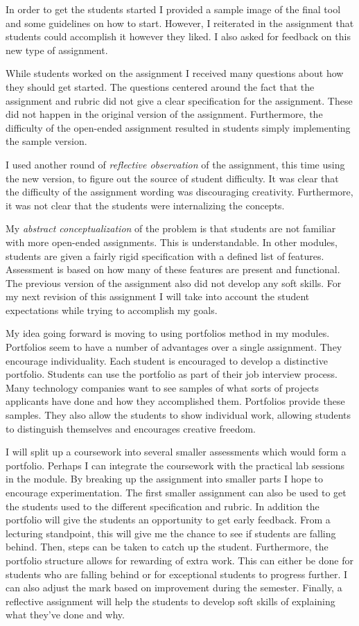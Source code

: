 \documentclass[
]{article}
\begin{document}
In order to get the students started I provided a sample image of the
final tool and some guidelines on how to start. However, I reiterated in
the assignment that students could accomplish it however they liked. I
also asked for feedback on this new type of assignment.

While students worked on the assignment I received many questions about
how they should get started. The questions centered around the fact that
the assignment and rubric did not give a clear specification for the
assignment. These did not happen in the original version of the
assignment. Furthermore, the difficulty of the open-ended assignment
resulted in students simply implementing the sample version.

I used another round of \emph{reflective observation} of the assignment,
this time using the new version, to figure out the source of student
difficulty. It was clear that the difficulty of the assignment wording
was discouraging creativity. Furthermore, it was not clear that the
students were internalizing the concepts.

My \emph{abstract conceptualization} of the problem is that students are
not familiar with more open-ended assignments. This is understandable.
In other modules, students are given a fairly rigid specification with a
defined list of features. Assessment is based on how many of these
features are present and functional. The previous version of the
assignment also did not develop any soft skills. For my next revision of
this assignment I will take into account the student expectations while
trying to accomplish my goals.

My idea going forward is moving to using portfolios method in
my modules. Portfolios seem to have a number of advantages over a single
assignment. They encourage individuality. Each student is encouraged to
develop a distinctive portfolio. Students can use the portfolio as part
of their job interview process. Many technology companies want to see
samples of what sorts of projects applicants have done and how they
accomplished them. Portfolios provide these samples. They also allow the
students to show individual work, allowing students to distinguish
themselves and encourages creative freedom.

I will split up a coursework into several smaller assessments which
would form a portfolio. Perhaps I can integrate the coursework with the
practical lab sessions in the module. By breaking up the assignment into
smaller parts I hope to encourage experimentation. The first smaller
assignment can also be used to get the students used to the different
specification and rubric. In addition the portfolio will give the
students an opportunity to get early feedback. From a lecturing
standpoint, this will give me the chance to see if students are falling
behind. Then, steps can be taken to catch up the student. Furthermore,
the portfolio structure allows for rewarding of extra work. This can
either be done for students who are falling behind or for exceptional
students to progress further. I can also adjust the mark based on
improvement during the semester. Finally, a reflective assignment will
help the students to develop soft skills of explaining what they've done
and why.
\end{document}

